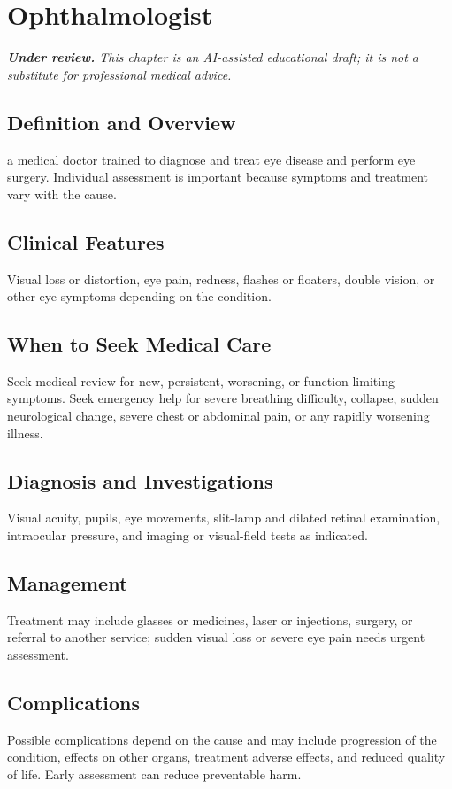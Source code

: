 \chapter{Ophthalmologist}

\medskip
\noindent\textit{\textbf{Under review.} This chapter is an AI-assisted educational draft; it is not a substitute for professional medical advice.}

\section*{Definition and Overview}
a medical doctor trained to diagnose and treat eye disease and perform eye surgery. Individual assessment is important because symptoms and treatment vary with the cause.

\section*{Clinical Features}
Visual loss or distortion, eye pain, redness, flashes or floaters, double vision, or other eye symptoms depending on the condition.

\section*{When to Seek Medical Care}
Seek medical review for new, persistent, worsening, or function-limiting symptoms. Seek emergency help for severe breathing difficulty, collapse, sudden neurological change, severe chest or abdominal pain, or any rapidly worsening illness.

\section*{Diagnosis and Investigations}
Visual acuity, pupils, eye movements, slit-lamp and dilated retinal examination, intraocular pressure, and imaging or visual-field tests as indicated.

\section*{Management}
Treatment may include glasses or medicines, laser or injections, surgery, or referral to another service; sudden visual loss or severe eye pain needs urgent assessment.

\section*{Complications}
Possible complications depend on the cause and may include progression of the condition, effects on other organs, treatment adverse effects, and reduced quality of life. Early assessment can reduce preventable harm.

